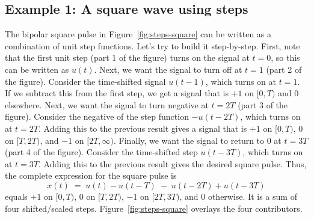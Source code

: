 \documentclass{ee102_notes}
\begin{document}
\subsection{Example 1: A square wave using steps}
 The bipolar square pulse in Figure~\ref{fig:steps-square} can be written as a combination of unit step functions. Let's try to build it step-by-step. First, note that the first unit step (part 1 of the figure) turns on the signal at $t=0$, so this can be written as $u(t)$. Next, we want the signal to turn off at $t=1$ (part 2 of the figure). Consider the time-shifted signal $u(t-1)$, which turns on at $t=1$. If we subtract this from the first step, we get a signal that is $+1$ on $[0,T)$ and $0$ elsewhere. Next, we want the signal to turn negative at $t=2T$ (part 3 of the figure). Consider the negative of the step function $-u(t-2T)$, which turns on at $t=2T$. Adding this to the previous result gives a signal that is $+1$ on $[0,T)$, $0$ on $[T,2T)$, and $-1$ on $[2T,\infty)$. Finally, we want the signal to return to $0$ at $t=3T$ (part 4 of the figure). Consider the time-shifted step $u(t-3T)$, which turns on at $t=3T$. Adding this to the previous result gives the desired square pulse. Thus, the complete expression for the square pulse is
\[
x(t) \;=\; u(t)-u(t-T)\;-\;u(t-2T)+u(t-3T)
\]
equals $+1$ on $[0,T)$, $0$ on $[T,2T)$, $-1$ on $[2T,3T)$, and $0$ otherwise.
It is a sum of four shifted/scaled steps. Figure~\ref{fig:steps-square} overlays the four contributors.
\end{document}
